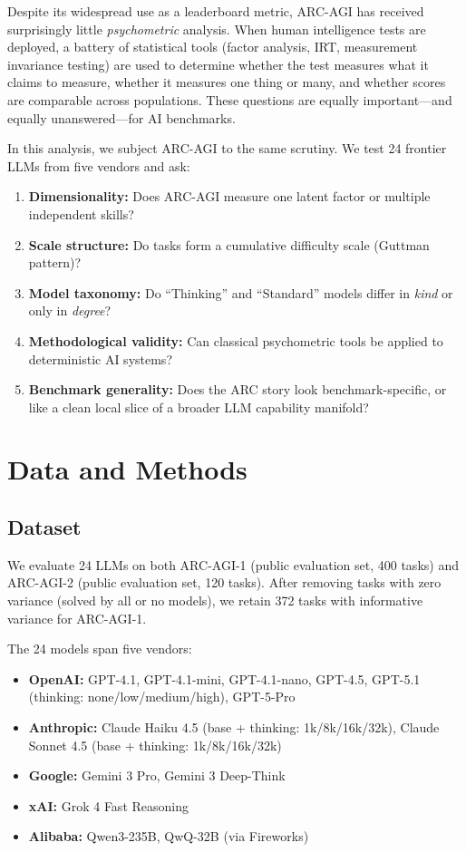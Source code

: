 \documentclass[11pt, letterpaper]{article}
\begin{document}
Despite its widespread use as a leaderboard metric, ARC-AGI has received surprisingly little \textit{psychometric} analysis. When human intelligence tests are deployed, a battery of statistical tools (factor analysis, IRT, measurement invariance testing) are used to determine whether the test measures what it claims to measure, whether it measures one thing or many, and whether scores are comparable across populations. These questions are equally important---and equally unanswered---for AI benchmarks.

In this analysis, we subject ARC-AGI to the same scrutiny. We test 24 frontier LLMs from five vendors and ask:

\begin{enumerate}
    \item \textbf{Dimensionality:} Does ARC-AGI measure one latent factor or multiple independent skills?
    \item \textbf{Scale structure:} Do tasks form a cumulative difficulty scale (Guttman pattern)?
    \item \textbf{Model taxonomy:} Do ``Thinking'' and ``Standard'' models differ in \textit{kind} or only in \textit{degree}?
    \item \textbf{Methodological validity:} Can classical psychometric tools be applied to deterministic AI systems?
    \item \textbf{Benchmark generality:} Does the ARC story look benchmark-specific, or like a clean local slice of a broader LLM capability manifold?
\end{enumerate}

\section{Data and Methods}
\label{sec:methods}

\subsection{Dataset}

We evaluate 24 LLMs on both ARC-AGI-1 (public evaluation set, 400 tasks) and ARC-AGI-2 (public evaluation set, 120 tasks). After removing tasks with zero variance (solved by all or no models), we retain 372 tasks with informative variance for ARC-AGI-1.

The 24 models span five vendors:
\begin{itemize}
    \item \textbf{OpenAI:} GPT-4.1, GPT-4.1-mini, GPT-4.1-nano, GPT-4.5, GPT-5.1 (thinking: none/low/medium/high), GPT-5-Pro
    \item \textbf{Anthropic:} Claude Haiku 4.5 (base + thinking: 1k/8k/16k/32k), Claude Sonnet 4.5 (base + thinking: 1k/8k/16k/32k)
    \item \textbf{Google:} Gemini 3 Pro, Gemini 3 Deep-Think
    \item \textbf{xAI:} Grok 4 Fast Reasoning
    \item \textbf{Alibaba:} Qwen3-235B, QwQ-32B (via Fireworks)
\end{itemize}
\end{document}
